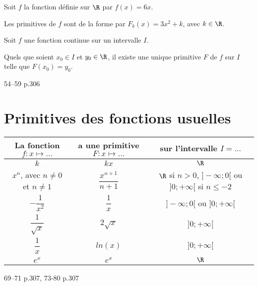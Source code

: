 \documentclass[a4paper]{article}
\begin{document}
\begin{example*}{}{}
  Soit $f$ la fonction définie sur $\R$ par $f(x)=6x$.
  
  Les primitives de $f$ sont de la forme par $F_k(x)=3x^2+k$, avec $k\in\R$.
\end{example*}

\begin{proprieteadm*}{}{}
Soit $f$ une fonction continue sur un intervalle $I$.

Quels que soient $x_0 \in I$ et $y_0 \in \R$, il existe une unique primitive $F$ de $f$ sur $I$ telle que $F(x_0)=y_0$.
\end{proprieteadm*}

\begin{exercices}{}{}
54--59 p.306
\end{exercices}

\section{Primitives des fonctions usuelles}


\begin{proprieteadm*}{}{}
  \begin{center}
    \renewcommand\arraystretch{2}
    \begin{tabular}{|c|c|c|}
      \hline
      La fonction $f:x\longmapsto ... $ &  a une primitive $F:x\longmapsto ...$ & sur l'intervalle $I=...$\\
       \hline
        $k$ & $kx$ & $\R$ \\
       \hline
       $x^n$, avec $n\neq0$ et $n\neq 1$ & $\dfrac{x^{n+1}}{n+1}$ & $\R$ si $n>0$, $]-\infty;0[$ ou $]0;+\infty[$ si $n\leqslant -2$ \\
       \hline
        $-\dfrac{1}{x^2}$ & $\dfrac{1}{x}$ & $]-\infty;0[$ ou $]0;+\infty[$ \\
       \hline
       $\dfrac{1}{\sqrt{x}}$ & $2\sqrt{x}$ & $]0;+\infty[$ \\
       \hline
       $\dfrac{1}{x}$ & $ln(x)$ & $]0;+\infty[$ \\
       \hline
       $e^x$ & $e^x$ & $\R$ \\
       \hline     
  \end{tabular}
  \end{center}
\end{proprieteadm*}

\begin{exercices}{}{}
  69--71 p.307,  73-80 p.307
\end{exercices}
\end{document}
